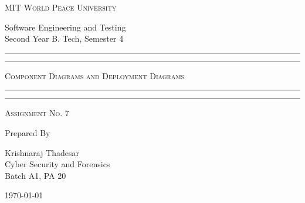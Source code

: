 \documentclass[11pt]{article}
\begin{document}
\begin{titlepage}
	\centering


	\huge\textsc{
		MIT World Peace University
	}\\

	\vspace{0.75\baselineskip} %

	\LARGE{
		Software Engineering and Testing\\
		Second Year B. Tech, Semester 4
	}

	\vfill %


	\rule{\textwidth}{1.6pt}\vspace*{-\baselineskip}\vspace*{2pt}
	\rule{\textwidth}{0.6pt}
	\vspace{0.75\baselineskip} %



	\huge{\textsc{
			Component Diagrams and Deployment Diagrams
		}} \\



	\vspace{0.5\baselineskip} %
	\rule{\textwidth}{0.6pt}\vspace*{-\baselineskip}\vspace*{2.8pt}
	\rule{\textwidth}{1.6pt}

	\vspace{1\baselineskip} %


	\LARGE\textsc{
		\centering
		Assignment No. 7
	} %
	\vfill


	Prepared By
	\vspace{0.5\baselineskip} %

	\Large{
		Krishnaraj Thadesar \\
		Cyber Security and Forensics\\
		Batch A1, PA 20
	}


	\vspace{0.5\baselineskip} %
	\today

\end{titlepage}
\end{document}
